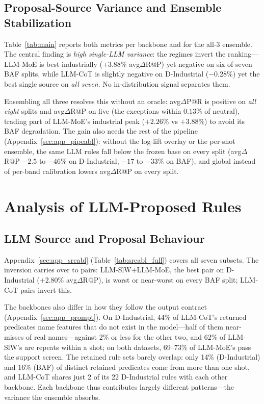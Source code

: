 \documentclass[11pt]{article}
\begin{document}
\subsection{Proposal-Source Variance and Ensemble Stabilization}\label{sec:results:main}


Table~\ref{tab:main} reports both metrics per backbone and for the all-3 ensemble. The central
finding is \emph{high single-LLM variance}: the regimes invert the ranking---LLM-MoE is best
industrially ($+3.88\%$ avg$\Delta$R@P) yet negative on six of seven BAF splits, while
LLM-CoT is slightly negative on D-Industrial ($-0.28\%$) yet the best single source on
\emph{all seven}. No in-distribution signal separates them.

Ensembling all three resolves this without an oracle: avg$\Delta$P@R is positive on \emph{all eight}
splits and avg$\Delta$R@P on five (the exceptions within $0.13\%$ of neutral), trading part
of LLM-MoE's industrial peak ($+2.26\%$ vs $+3.88\%$) to avoid its BAF degradation.
The gain also needs the rest of the pipeline (Appendix~\ref{sec:app_pipeabl}): without the log-lift
overlay or the per-shot ensemble, the same LLM rules fall below the frozen base on every split
(avg$\Delta$R@P $-2.5$ to $-46\%$ on D-Industrial, $-17$ to $-33\%$ on BAF), and global instead of
per-band calibration lowers avg$\Delta$R@P on every split.

\section{Analysis of LLM-Proposed Rules}
\label{sec:ablation}

\subsection{LLM Source and Proposal Behaviour}

Appendix~\ref{sec:app_srcabl} (Table~\ref{tab:srcabl_full}) covers all seven subsets. The
inversion carries over to pairs: LLM-SlW$+$LLM-MoE, the best pair on D-Industrial
($+2.80\%$ avg$\Delta$R@P), is worst or near-worst on every BAF split; LLM-CoT pairs invert this.

The backbones also differ in how they follow the output contract (Appendix~\ref{sec:app_prompt}). On
D-Industrial, 44\% of LLM-CoT's returned predicates name features that do not exist in the
model---half of them near-misses of real names---against 2\% or less for the other two, and
62\% of LLM-SlW's are repeats within a shot; on both datasets, 69--73\% of LLM-MoE's pass the support
screen. The retained rule sets barely overlap: only 14\% (D-Industrial) and 16\% (BAF) of distinct
retained predicates come from more than one shot, and LLM-CoT shares just 2 of its 22 D-Industrial
rules with each other backbone. Each backbone thus contributes largely different patterns---the
variance the ensemble absorbs.
\end{document}
